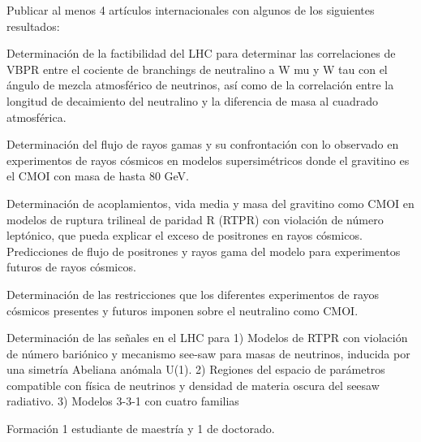 Publicar al menos 4 artículos internacionales con algunos de los siguientes resultados:

Determinación de la factibilidad del LHC para determinar las correlaciones de VBPR entre el cociente de branchings de neutralino a W mu y W tau con el ángulo de mezcla atmosférico de neutrinos, así como de la correlación entre la longitud de decaimiento del neutralino y la diferencia de masa al cuadrado atmosférica.

Determinación del flujo de rayos gamas y su confrontación con lo observado en experimentos de rayos cósmicos en modelos supersimétricos donde el gravitino es el CMOI con masa de hasta 80 GeV. 

Determinación de acoplamientos, vida media y masa del gravitino como CMOI en modelos de ruptura trilineal de paridad R (RTPR) con violación de número leptónico, que pueda explicar el exceso de positrones en rayos cósmicos. Predicciones de flujo de positrones y rayos gama del modelo para experimentos futuros de rayos cósmicos. 

Determinación de las restricciones que los diferentes experimentos de rayos cósmicos 
presentes y futuros imponen sobre el neutralino como CMOI. 

Determinación de las señales en el LHC para 1) Modelos de RTPR con violación de número bariónico y mecanismo see-saw para masas de neutrinos, inducida por una simetría Abeliana anómala U(1). 2) Regiones del espacio de parámetros compatible con física de neutrinos y densidad de materia oscura del seesaw radiativo. 3) Modelos 3-3-1 con cuatro familias

Formación 1 estudiante de maestría y 1 de doctorado.



